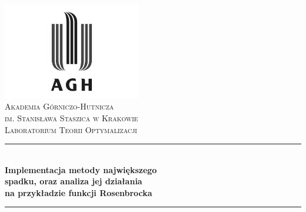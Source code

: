 \begin{titlepage}

\newcommand{\HRule}{\rule{\linewidth}{0.5mm}}

\center
 

\includegraphics[width=6cm]{../res/img/logo.png}\\[1cm]
 
 

\textsc{\LARGE Akademia Górniczo-Hutnicza \\[0.2cm]
im. Stanisława Staszica w Krakowie}\\[1.5cm]

\textsc{\Large Laboratorium Teorii Optymalizacji}\\[0.5cm]


\HRule \\[0.5cm]
{ \huge \bfseries Implementacja metody największego } \\[0.3cm]
{ \huge \bfseries spadku, oraz analiza jej działania } \\[0.2cm]
{ \huge \bfseries na przykładzie funkcji Rosenbrocka } \\[0.3cm]
\HRule \\[1.5cm]


\end{titlepage}
